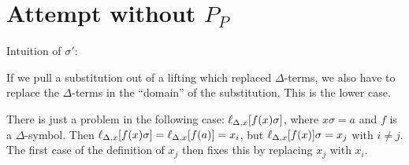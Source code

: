 \documentclass[,%
	paper=a4,%
	DIV14, 
	liststotoc,
	bibtotoc,
	draft=false,%
	numbers=noendperiod
]{scrartcl}
\newcommand{\lif}[1]{\lift{\Delta}{#1}{x}}
\begin{document}
\section{Attempt without $P_P$}


Intuition of $\sigma'$:

If we pull a substitution out of a lifting which replaced $\Delta$-terms, we also have to replace the $\Delta$-terms 
in the ``domain'' of the substitution. This is the lower case.

There is just a problem in the following case: $\lif{ f(x)\sigma }$, where $x\sigma = a$ and $f$ is a $\Delta$-symbol.
Then $\lif{ f(x)\sigma } = \lif{ f(a) } = x_i$, but $\lif{f(x)}\sigma = x_j$ with $i\neq j$.
The first case of the definition of $x_j$ then fixes this by replacing $x_j$ with $x_i$. 
\end{document}
